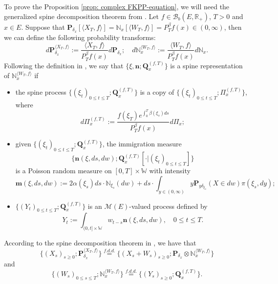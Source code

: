 \documentclass[UTF8]{pkuthss}
\theoremstyle{plain}
\theoremstyle{definition}
\numberwithin{equation}{section}
\begin{document}
    To prove the Proposition \ref{prop: complex FKPP-equation}, we will need the generalized spine decomposition theorem from \cite{RenSongSun2017Spine}. 
    Let $f\in \mathcal B_b(E,\mathbb R_+)$, $T >0$ and $x\in E$.
    Suppose that $\mathbf P_{\delta_x}[\langle X_T, f\rangle] = \mathbb N_x[\langle W_T, f\rangle] = P^{\beta}_T f(x) \in (0,\infty)$, then we can define the following probability transforms:
\begin{equation}
    d\mathbf P_{\delta_x}^{\langle X_T, f\rangle}
    := \frac{\langle X_T, f\rangle}{P_T^{\beta} f(x)} d\mathbf P_{\delta_x};
    \quad d\mathbb N_x^{\langle W_T, f\rangle}
    :=  \frac{\langle W_T, f\rangle}{P_T^{\beta} f(x)} d\mathbb N_x.
\end{equation}
    Following the definition in \cite{RenSongSun2017Spine}, we say that $\{\xi, \mathbf n;\mathbf Q_{x}^{(f,T)}\}$ is a spine representation of $\mathbb N_x^{\langle W_T, f\rangle}$ if
\begin{itemize}
\item
    the spine process $\{(\xi_t)_{0\leq t\leq T}; \mathbf Q^{(f,T)}_x\}$ is a copy of $\{(\xi_t)_{0\leq t\leq T}; \Pi^{(f,T)}_{x}\}$,
    where
\begin{equation}
    d\Pi_x^{(f,T)} := \frac{f(\xi_T)e^{\int_0^T \beta(\xi_s)ds}}{P^{\beta}_T f(x)} d \Pi_x;
\end{equation}
\item
    given $\{(\xi_t)_{0\leq t\leq T}; \mathbf Q^{(f,T)}_x\}$, the immigration measure 
\[ \{\mathbf n(\xi,ds,dw); \mathbf Q^{(f,T)}_x[\cdot |(\xi_t)_{0\leq t\leq T}]\}\]
    is a Poisson random measure on $[0,T] \times \mathbb W$ with intensity
\begin{equation}
\label{eq: conditional intensity}
    \mathbf m(\xi,ds,dw)
    := 2 \alpha(\xi_s) ds \cdot \mathbb N_{\xi_s}(dw) + ds \cdot \int_{y\in (0,\infty)} y \mathbf P_{y\delta_{\xi_s}}(X\in dw) \pi(\xi_s,dy);
\end{equation}
\item
    $\{(Y_t)_{0\leq t\leq T}; \mathbf Q^{(f,T)}_x\}$ is an $\mathcal M(E)$-valued process defined by
\begin{equation}
    Y_t
    := \int_{(0,t] \times \mathbb W} w_{t-s} \mathbf n(\xi,ds,dw),
    \quad 0 \leq t\leq T.
\end{equation}
\end{itemize}
    According to the spine decomposition theorem in \cite{RenSongSun2017Spine}, we have that
\begin{equation}
\label{eq: Spine decomposition 1}
    \{(X_s)_{s \geq 0};\mathbf P_{\delta_x}^{\langle X_T, f\rangle}\}
    \overset{f.d.d.}{=} \{(X_s + W_s)_{s \geq 0};\mathbf P_{\delta_x} \otimes \mathbb N_x^{\langle W_T, f\rangle} \}
\end{equation}
    and
\begin{equation}
\label{eq: Spine decomposition 2}
    \{(W_s)_{0\leq s\leq T};\mathbb N_x^{\langle W_T, f\rangle}\}
    \overset{f.d.d.}{=} \{(Y_s)_{s \geq 0};\mathbf Q_x^{(f,T)}\}.
\end{equation}
\end{document}
